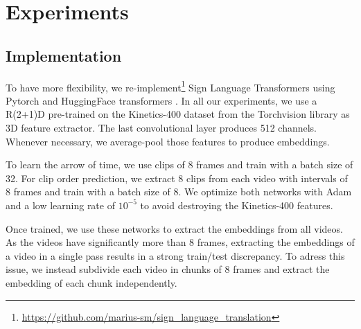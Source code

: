 \documentclass[final]{cvpr}
\begin{document}
\section{Experiments}
\subsection{Implementation}

To have more flexibility, we re-implement\footnote{\url{https://github.com/marius-sm/sign_language_translation}} Sign Language Transformers \cite{neccam} using Pytorch and HuggingFace transformers \cite{huggingface}. In all our experiments, we use a R(2+1)D \cite{r2plus1} pre-trained on the Kinetics-400 \cite{kinetics} dataset from the Torchvision library as 3D feature extractor. The last convolutional layer produces 512 channels. Whenever necessary, we average-pool those features to produce embeddings.

To learn the arrow of time, we use clips of 8 frames and train with a batch size of 32. For clip order prediction, we extract 8 clips from each video with intervals of 8 frames and train with a batch size of 8. We optimize both networks with Adam and a low learning rate of $10^{-5}$ to avoid destroying the Kinetics-400 features.

Once trained, we use these networks to extract the embeddings from all videos. As the videos have significantly more than 8 frames,  extracting the embeddings of a video in a single pass results in a strong train/test discrepancy. To adress this issue, we instead subdivide each video in chunks of 8 frames and extract the embedding of each chunk independently.
\end{document}
